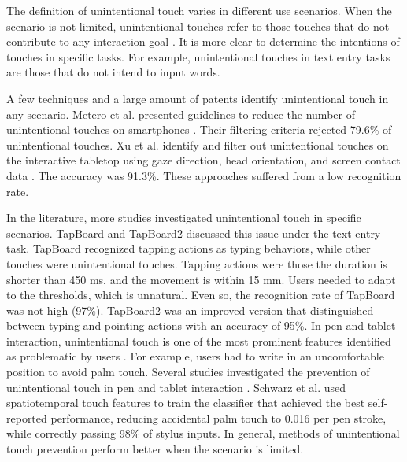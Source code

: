 The definition of unintentional touch varies in different use scenarios. When the scenario is not limited, unintentional touches refer to those touches that do not contribute to any interaction goal \cite{2020-TabletopTouch}. It is more clear to determine the intentions of touches in specific tasks. For example, unintentional touches in text entry tasks are those that do not intend to input words.

A few techniques \cite{2012-IdentifyUnint,2020-TabletopTouch} and a large amount of patents \cite{2016-Classification,2006-PadUnint,2013-System,2013-Precluding,2015-TouchScreen} identify unintentional touch in any scenario. Metero et al. presented guidelines to reduce the number of unintentional touches on smartphones \cite{2012-IdentifyUnint}. Their filtering criteria rejected 79.6\% of unintentional touches. Xu et al. identify and filter out unintentional touches on the interactive tabletop using gaze direction, head orientation, and screen contact data \cite{2020-TabletopTouch}. The accuracy was 91.3\%. These approaches suffered from a low recognition rate.

In the literature, more studies investigated unintentional touch in specific scenarios. TapBoard and TapBoard2 discussed this issue under the text entry task. TapBoard recognized tapping actions as typing behaviors, while other touches were unintentional touches. Tapping actions were those the duration is shorter than 450 ms, and the movement is within 15 mm. Users needed to adapt to the thresholds, which is unnatural. Even so, the recognition rate of TapBoard was not high (97\%). TapBoard2 was an improved version that distinguished between typing and pointing actions with an accuracy of 95\%.
In pen and tablet interaction, unintentional touch is one of the most prominent features identified as problematic by users \cite{2014-PenMightier}. For example, users had to write in an uncomfortable position to avoid palm touch. Several studies investigated the prevention of unintentional touch in pen and tablet interaction \cite{2013-PalmInput,2014-PenUnint,2014-PalmRejection}. Schwarz et al. used spatiotemporal touch features to train the classifier \cite{2014-PalmRejection} that achieved the best self-reported performance, reducing accidental palm touch to 0.016 per pen stroke, while correctly passing 98\% of stylus inputs.
In general, methods of unintentional touch prevention perform better when the scenario is limited.


